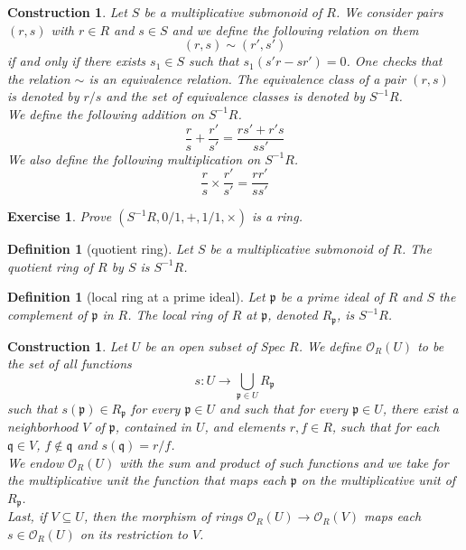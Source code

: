 \documentclass[12pt]{article}
\newtheorem{definition}[proposition]{Definition}
\newtheorem{ex}[proposition]{Exercise}
\newtheorem{cons}[proposition]{Construction}
\begin{document}
\begin{cons}
	Let $S$ be a multiplicative submonoid of $R$. We consider pairs $(r, s)$ with $r \in R$ and $s \in S$ and we define the following relation on them
	\[
	(r, s) \sim (r', s')
	\]
	if and only if there exists $s_1 \in S$ such that $s_1(s' r - s r') = 0$. One checks that the relation $\sim$ is an equivalence relation. The equivalence class of a pair $(r, s)$ is denoted by $r/s$ and the set of equivalence classes is denoted by $S^{-1} R$. \\
	We define the following addition on $S^{-1} R$.
	\[
	\frac{r}{s} + \frac{r'}{s'} = \frac{r s' + r' s}{s s'}
	\]
	We also define the following multiplication on $S^{-1} R$. 
	\[
	\frac{r}{s} \times \frac{r'}{s'} = \frac{r r'}{s s'}
	\]
\end{cons}

\begin{ex}
	Prove $(S^{-1} R, 0/1, +, 1/1, \times)$ is a ring.
\end{ex}		

\begin{definition}[quotient ring]
	Let $S$ be a multiplicative submonoid of $R$. The quotient ring of $R$ by $S$ is $S^{-1} R$. 
\end{definition}

\begin{definition}[local ring at a prime ideal] \label{localringat}
	Let $\mathfrak{p}$ be a prime ideal of $R$ and $S$ the complement of $\mathfrak{p}$ in $R$. The local ring of $R$ at $\mathfrak{p}$, denoted $R_{\mathfrak{p}}$, is $S^{-1} R$. 
\end{definition}	

\begin{cons}
	Let $U$ be an open subset of Spec $R$. We define $\mathscr{O}_R(U)$ to be the set of all functions 
	\[
	s: U \rightarrow \bigcup \limits_{\mathfrak{p} \in U} R_{\mathfrak{p}}
	\]
	such that $s(\mathfrak{p}) \in R_{\mathfrak{p}}$ for every $\mathfrak{p} \in U$ and such that for every $\mathfrak{p} \in U$, there exist a neighborhood $V$ of $\mathfrak{p}$, contained in $U$, and elements $r, f \in R$, such that for each $\mathfrak{q} \in V$, $f \notin \mathfrak{q}$ and $s(\mathfrak{q}) = r/f$. \\
	We endow $\mathscr{O}_R(U)$ with the sum and product of such functions and we take for the multiplicative unit the function that maps each $\mathfrak{p}$ on the multiplicative unit of $R_{\mathfrak{p}}$. \\
	Last, if $V \subseteq U$, then the morphism of rings $\mathscr{O}_R(U) \rightarrow \mathscr{O}_R(V)$ maps each $s \in \mathscr{O}_R(U)$ on its restriction to $V$. 
\end{cons}
\end{document}
